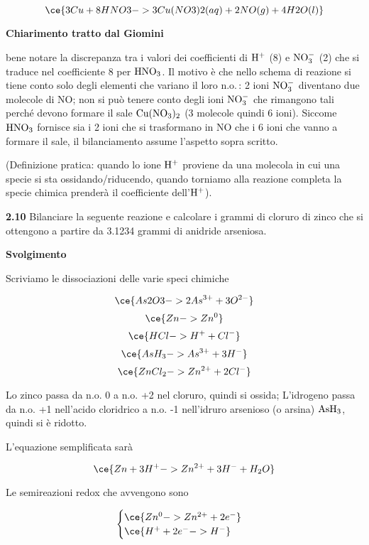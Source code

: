 $$\ce{3Cu + 8HNO3 -> 3Cu(NO3)2(aq) + 2NO(g) + 4H2O(l)}$$

\textbf{Chiarimento tratto dal Giomini}

\E bene notare la discrepanza tra i valori dei coefficienti di $\rm H^+$ (8) e $\rm NO_3^-$ (2) che si traduce nel coefficiente 8 per $\rm HNO_3$. Il motivo è che nello schema di reazione si tiene conto solo degli elementi che variano il loro n.o.\,: 2 ioni $\rm NO_3^-$ diventano due molecole di NO; non si può tenere conto degli ioni $\rm NO_3^-$ che rimangono tali perché devono formare il sale $\rm Cu(NO_3)_2$ (3 molecole quindi 6 ioni). Siccome $\rm HNO_3$ fornisce sia i 2 ioni che si trasformano in NO che i 6 ioni che vanno a formare il sale, il bilanciamento assume l'aspetto sopra scritto.

(Definizione pratica: quando lo ione $\rm H^+$ proviene da una molecola in cui una specie si sta ossidando/riducendo, quando torniamo alla reazione completa la specie chimica prenderà il coefficiente dell'$\rm H^+$).

\vspace{0.2cm}\textbf{2.10} Bilanciare la seguente reazione e calcolare i grammi di cloruro di zinco che si ottengono a partire da 3.1234 grammi di anidride arseniosa.

\begin{center}
\end{center}

\large\textbf{Svolgimento}\normalsize

\vspace{0.2cm}Scriviamo le dissociazioni delle varie speci chimiche

$$\ce{As2O3 -> 2As^{3+} + 3O^{2-}}$$
$$\ce{Zn -> Zn^0}$$
$$\ce{HCl -> H^+ + Cl^-}$$
$$\ce{AsH_3 -> As^{3+} + 3H^{-}}$$
$$\ce{ZnCl_2 -> Zn^{2+} + 2Cl^{-}}$$

Lo zinco passa da n.o. 0 a n.o. +2 nel cloruro, quindi si ossida; L'idrogeno passa da n.o. +1 nell'acido cloridrico a n.o. -1 nell'idruro arsenioso (o arsina) $\rm AsH_3$, quindi si è ridotto.

L'equazione semplificata sarà

$$\ce{Zn + 3H^+ -> Zn^{2+} + 3H^- + H_2O }$$

Le semireazioni redox che avvengono sono

$$\begin{cases}
    \ce{Zn^{0} -> Zn^{2+} + 2e^-}\\
    \ce{H^+ + 2e^- -> H^-}
\end{cases}$$

